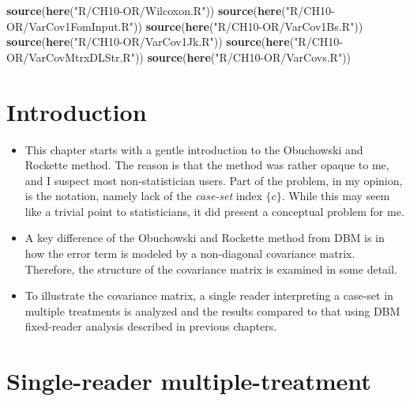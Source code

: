 \documentclass[
]{book}
\newenvironment{Shaded}{\begin{snugshade}}{\end{snugshade}}
\newcommand{\KeywordTok}[1]{\textcolor[rgb]{0.13,0.29,0.53}{\textbf{#1}}}
\newcommand{\NormalTok}[1]{#1}
\newcommand{\StringTok}[1]{\textcolor[rgb]{0.31,0.60,0.02}{#1}}
\begin{document}
\begin{Shaded}
\begin{Highlighting}[]
\KeywordTok{source}\NormalTok{(}\KeywordTok{here}\NormalTok{(}\StringTok{"R/CH10-OR/Wilcoxon.R"}\NormalTok{))}
\KeywordTok{source}\NormalTok{(}\KeywordTok{here}\NormalTok{(}\StringTok{"R/CH10-OR/VarCov1FomInput.R"}\NormalTok{))}
\KeywordTok{source}\NormalTok{(}\KeywordTok{here}\NormalTok{(}\StringTok{"R/CH10-OR/VarCov1Bs.R"}\NormalTok{))}
\KeywordTok{source}\NormalTok{(}\KeywordTok{here}\NormalTok{(}\StringTok{"R/CH10-OR/VarCov1Jk.R"}\NormalTok{)) }
\KeywordTok{source}\NormalTok{(}\KeywordTok{here}\NormalTok{(}\StringTok{"R/CH10-OR/VarCovMtrxDLStr.R"}\NormalTok{))}
\KeywordTok{source}\NormalTok{(}\KeywordTok{here}\NormalTok{(}\StringTok{"R/CH10-OR/VarCovs.R"}\NormalTok{))}
\end{Highlighting}
\end{Shaded}

\hypertarget{or-method-intro-intro}{%
\section{Introduction}\label{or-method-intro-intro}}

\begin{itemize}
\item
  This chapter starts with a gentle introduction to the Obuchowski and Rockette method. The reason is that the method was rather opaque to me, and I suspect most non-statistician users. Part of the problem, in my opinion, is the notation, namely lack of the \emph{case-set} index \(\{c\}\). While this may seem like a trivial point to statisticians, it did present a conceptual problem for me.
\item
  A key difference of the Obuchowski and Rockette method from DBM is in how the error term is modeled by a non-diagonal covariance matrix. Therefore, the structure of the covariance matrix is examined in some detail.
\item
  To illustrate the covariance matrix, a single reader interpreting a case-set in multiple treatments is analyzed and the results compared to that using DBM fixed-reader analysis described in previous chapters.
\end{itemize}

\hypertarget{or-method-intro-single-reader}{%
\section{Single-reader multiple-treatment}\label{or-method-intro-single-reader}}
\end{document}

